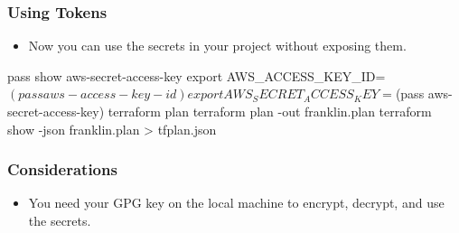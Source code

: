 \documentclass[aspectratio=169]{beamer}
\begin{document}
{
    \begin{frame}
	   \frametitle{Using Tokens}

    	\begin{itemize}
    		\item Now you can use the secrets in your project without exposing them.
    	\end{itemize}

       \begin{spverbatim}
        pass show aws-secret-access-key
        export AWS_ACCESS_KEY_ID=$(pass aws-access-key-id)
        export AWS_SECRET_ACCESS_KEY=$(pass aws-secret-access-key)
        terraform plan
        terraform plan -out franklin.plan
        terraform show -json franklin.plan > tfplan.json
        \end{spverbatim}
    \end{frame}
}

{
    \begin{frame}
	   \frametitle{Considerations}
	\begin{itemize}
		\item You need your GPG key on the local machine to encrypt, decrypt, and use the secrets.
	\end{itemize}
    \end{frame}
}
\end{document}
